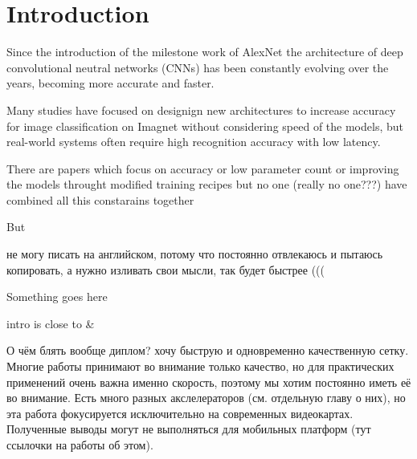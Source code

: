 



\chapter{Introduction}


Since the introduction of the milestone work of AlexNet \cite{alexnet??} the architecture of deep convolutional neutral networks (CNNs) has been constantly evolving over the years, becoming more accurate and faster. 

Many studies have focused on designign new architectures to increase accuracy for image classification on Imagnet without considering speed of the models, but real-world systems often require high recognition accuracy with low latency.

There are papers which focus on accuracy or low parameter count or improving the models throught modified training recipes but no one (really no one???) have combined all this constarains together

But 


не могу писать на английском, потому что постоянно отвлекаюсь и пытаюсь копировать, а нужно изливать свои мысли, так будет быстрее (((






Something goes here

intro is close to \cite{lin2020neural_genet} & \cite{ridnik2021_tresnet}

О чём блять вообще диплом? хочу быструю и одновременно качественную сетку. 
Многие работы принимают во внимание только качество, но для практических применений очень важна именно скорость, поэтому мы хотим постоянно иметь её во внимание. Есть много разных акслелераторов (см. отдельную главу о них), но эта работа фокусируется исключительно на современных видеокартах. Полученные выводы могут не выполняться для мобильных платформ (тут ссылочки на работы об этом). 

